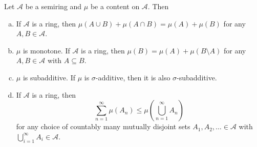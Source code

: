 \begin{theorem}
\label{properties of content}
    Let $\mathcal{A}$ be a semiring and $\mu$ be a content on $\mathcal{A}$. Then
    \begin{enumerate}[(a)]
        \item If $\mathcal{A}$ is a ring, then $\mu(A\cup B)+\mu(A\cap B)=\mu(A)+\mu(B)$ for any $A,B\in\mathcal{A}$.
        
        \item $\mu$ is monotone. If $\mathcal{A}$ is a ring, then $\mu(B)=\mu(A)+\mu(B\setminus A)$ for any $A,B\in\mathcal{A}$ with $A\subseteq B$.
        
        \item $\mu$ is subadditive. If $\mu$ is $\sigma$-additive, then it is also $\sigma$-subadditive.
        
        \item If $\mathcal{A}$ is a ring, then $$\sum_{n=1}^\infty \mu(A_n)\leq\mu\left(\bigcup_{n=1}^\infty A_n\right)$$ for any choice of countably many mutually disjoint sets $A_1,A_2,\ldots\in\mathcal{A}$ with $\bigcup_{i=1}^\infty A_i\in\mathcal{A}$.
    \end{enumerate}
\end{theorem}
